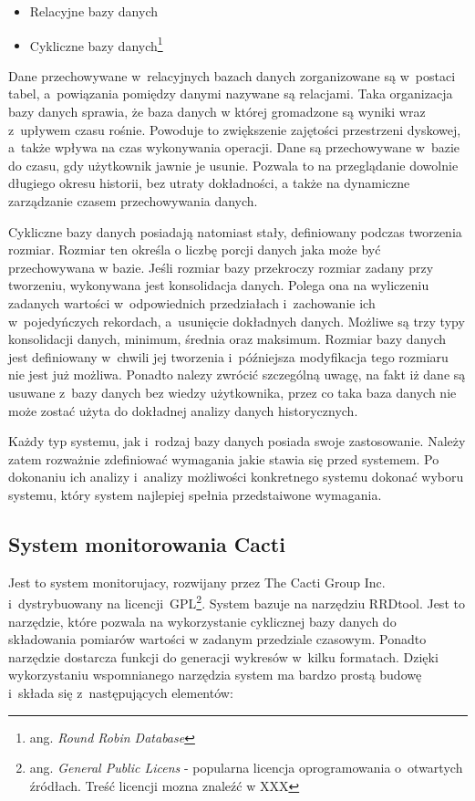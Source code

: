 \begin{itemize}
\item Relacyjne bazy danych
\item Cykliczne bazy danych\footnote{ang. {\em Round Robin Database}}
\end{itemize}

Dane przechowywane w~relacyjnych bazach danych zorganizowane są
w~postaci tabel, a~powiązania pomiędzy danymi nazywane są
relacjami. Taka organizacja bazy danych sprawia, że baza danych w
której gromadzone są wyniki wraz z~upływem czasu rośnie. Powoduje to
zwiększenie zajętości przestrzeni dyskowej, a~także wpływa na czas
wykonywania operacji. Dane są przechowywane w~bazie do czasu, gdy
użytkownik jawnie je usunie. Pozwala to na przeglądanie dowolnie
długiego okresu historii, bez utraty dokładności, a także na
dynamiczne zarządzanie czasem przechowywania danych.

Cykliczne bazy danych posiadają natomiast stały, definiowany podczas
tworzenia rozmiar. Rozmiar ten określa o liczbę porcji danych jaka
może być przechowywana w bazie. Jeśli rozmiar bazy przekroczy rozmiar
zadany przy tworzeniu, wykonywana jest konsolidacja danych. Polega ona
na wyliczeniu zadanych wartości w~odpowiednich przedziałach
i~zachowanie ich w~pojedyńczych rekordach, a~usunięcie dokładnych
danych. Możliwe są trzy typy konsolidacji danych, minimum, średnia
oraz maksimum. Rozmiar bazy danych jest definiowany w~chwili jej
tworzenia i~późniejsza modyfikacja tego rozmiaru nie jest już
możliwa. Ponadto nalezy zwrócić szczególną uwagę, na fakt iż dane są
usuwane z~bazy danych bez wiedzy użytkownika, przez co taka baza
danych nie może zostać użyta do dokładnej analizy danych
historycznych.

Każdy typ systemu, jak i~rodzaj bazy danych posiada swoje
zastosowanie. Należy zatem rozważnie zdefiniować wymagania jakie
stawia się przed systemem. Po dokonaniu ich analizy i~analizy
możliwości konkretnego systemu dokonać wyboru systemu, który system
najlepiej spełnia przedstaiwone wymagania.

\subsection[Cacti][System monitorowania Cacti]{System monitorowania Cacti}

Jest to system monitorujacy, rozwijany przez The Cacti Group
Inc. i~dystrybuowany na licencji~GPL\footnote{ ang. {\em General
    Public Licens} - popularna licencja oprogramowania o~otwartych
  źródłach. Treść licencji mozna znaleźć w XXX}. System bazuje na
narzędziu RRDtool. Jest to narzędzie, które pozwala na wykorzystanie
cyklicznej bazy danych do składowania pomiarów wartości w zadanym
przedziale czasowym. Ponadto narzędzie dostarcza funkcji do generacji
wykresów w~kilku formatach. Dzięki wykorzystaniu wspomnianego
narzędzia system ma bardzo prostą budowę i~składa się z~następujących
elementów:

